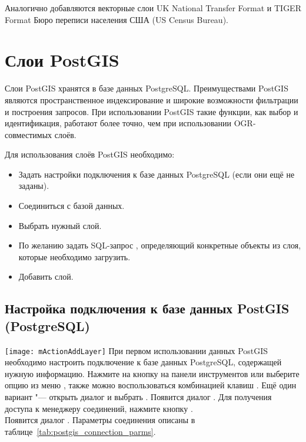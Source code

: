Аналогично добавляются векторные слои UK National Transfer Format и
TIGER Format Бюро переписи населения США (US Census Bureau).

\section{Слои PostGIS}
\label{label_postgis}

Слои PostGIS хранятся в базе данных PostgreSQL. Преимуществами PostGIS
являются пространственное индексирование и широкие возможности
фильтрации и построения запросов. При использовании PostGIS такие функции,
как выбор и идентификация, работают более точно, чем при использовании
OGR-совместимых слоёв.

Для использования слоёв PostGIS необходимо:

\begin{itemize}[label=--]
\item Задать настройки подключения \qg к базе данных PostgreSQL (если они
ещё не заданы).
\item Соединиться с базой данных.
\item Выбрать нужный слой.
\item По желанию задать SQL-запрос , определяющий конкретные
объекты из слоя, которые необходимо загрузить.
\item Добавить слой.
\end{itemize}

\subsection{Настройка подключения к базе данных PostGIS (PostgreSQL)}\label{sec:postgis_stored}

\texttt{[image: mActionAddLayer]} При первом использовании
данных PostGIS необходимо настроить подключение к базе данных PostgreSQL,
содержащей нужную информацию. Нажмите на кнопку
 на панели инструментов
или выберите опцию 
из меню , также можно воспользоваться комбинацией клавиш
. Ещё один вариант "--- открыть диалог
 и выбрать .
Появится диалог . Для получения доступа
к менеджеру соединений, нажмите кнопку
. \\
Появится диалог . Параметры соединения
описаны в таблице~\ref{tab:postgis_connection_parms}.

